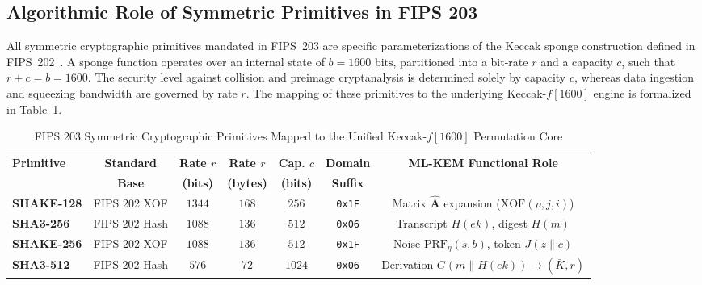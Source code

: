 \subsection{Algorithmic Role of Symmetric Primitives in FIPS 203}
\label{sec:fips203_primitives}

All symmetric cryptographic primitives mandated in FIPS~203 are specific parameterizations of the Keccak sponge construction defined in FIPS~202~\cite{fips202}. A sponge function operates over an internal state of $b = 1600\text{ bits}$, partitioned into a bit-rate $r$ and a capacity $c$, such that $r + c = b = 1600$. The security level against collision and preimage cryptanalysis is determined solely by capacity $c$, whereas data ingestion and squeezing bandwidth are governed by rate $r$. The mapping of these primitives to the underlying Keccak-$f[1600]$ engine is formalized in Table~\ref{tab:fips203_primitives}.

\begin{table}[ht]
\caption{FIPS 203 Symmetric Cryptographic Primitives Mapped to the Unified Keccak-$f[1600]$ Permutation Core}
\label{tab:fips203_primitives}
\centering
\footnotesize
\setlength{\tabcolsep}{4pt}
\begin{tabular*}{\columnwidth}{@{\extracolsep{\fill}} lcccccc @{}}
\toprule
\textbf{Primitive} & \textbf{Standard} & \textbf{Rate $r$} & \textbf{Rate $r$} & \textbf{Cap. $c$} & \textbf{Domain} & \textbf{ML-KEM Functional Role} \\
 & \textbf{Base} & \textbf{(bits)} & \textbf{(bytes)} & \textbf{(bits)} & \textbf{Suffix} & \\
\midrule
\textbf{SHAKE-128} & FIPS 202 XOF  & $1344$ & $168$ & $256$  & \texttt{0x1F} & Matrix $\hat{\mathbf{A}}$ expansion ($\text{XOF}(\rho, j, i)$) \\
\textbf{SHA3-256}  & FIPS 202 Hash & $1088$ & $136$ & $512$  & \texttt{0x06} & Transcript $H(ek)$, digest $H(m)$ \\
\textbf{SHAKE-256} & FIPS 202 XOF  & $1088$ & $136$ & $512$  & \texttt{0x1F} & Noise $\text{PRF}_\eta(s, b)$, token $J(z \parallel c)$ \\
\textbf{SHA3-512}  & FIPS 202 Hash & $576$  & $72$  & $1024$ & \texttt{0x06} & Derivation $G(m \parallel H(ek)) \to (\bar{K}, r)$ \\
\bottomrule
\end{tabular*}
\end{table}

